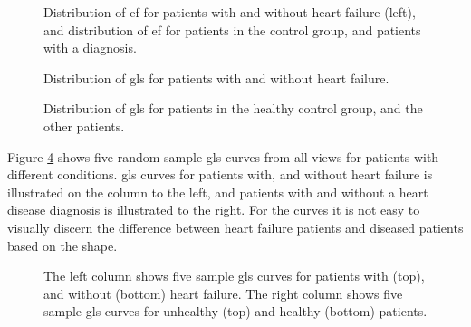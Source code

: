 \begin{figure}
    \centering
    
    \caption{Distribution of \acrshort{ef} for patients with and without heart failure (left), and distribution of \acrshort{ef} for patients in the control group, and patients with a diagnosis.}
    \label{fig:ef_hf_ind_dist}
\end{figure}

\begin{figure}
    \centering
    
    \caption{Distribution of \acrshort{gls} for patients with and without heart failure.}
    \label{fig:gls_hf_dist}
\end{figure}

\begin{figure}
    \centering
    
    \caption{Distribution of \acrshort{gls} for patients in the healthy control group, and the other patients.}
    \label{fig:gls_ind_dist}
\end{figure}

\clearpage

Figure \ref{fig:gls_curves_vs_hf_and_ind} shows five random sample \acrshort{gls} curves from all views for patients with different conditions. \acrshort{gls} curves for patients with, and without heart failure is illustrated on the column to the left, and patients with and without a heart disease diagnosis is illustrated to the right. For the curves it is not easy to visually discern the difference between heart failure patients and diseased patients based on the shape.

\begin{figure}
    \centering
    
    \caption{The left column shows five sample \acrshort{gls} curves for patients with (top), and without (bottom) heart failure. The right column shows five sample \acrshort{gls} curves for unhealthy (top) and healthy (bottom) patients.}
    \label{fig:gls_curves_vs_hf_and_ind}
\end{figure}

\clearpage

